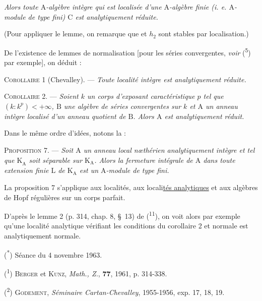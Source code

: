 
\textit{Alors toute $\mathrm A$-algèbre intègre qui est localisée d’une $\mathrm A$-algèbre finie (i. e. $\mathrm A$-module de type fini) $\mathrm C$ est analytiquement réduite.}

(Pour appliquer le lemme, on remarque que  et $h_2$ sont stables par localisation.)

De l’existence de lemmes de normalisation [pour les séries convergentes, \textit{voir} (\textsuperscript{5}) par exemple], on déduit :

\textsc{Corollaire 1} (Chevalley). --- \textit{Toute localité intègre est analytiquement réduite.}

\textsc{Corollaire 2.} --- \textit{Soient $k$ un corps d’exposant caractéristique $p$ tel que $(k:k^p)<+\infty$, $\mathrm B$ une algèbre de séries convergentes sur $k$ et $\mathrm A$ un anneau intègre localisé d’un anneau quotient de $\mathrm B$. Alors $\mathrm A$ est analytiquement réduit.}

Dans le même ordre d’idées, notons la :

\textsc{Proposition 7.} --- \textit{Soit $\mathrm A$ un anneau local nœthérien analytiquement intègre et tel que $\mathrm K_{\widehat{\mathrm A}}$ soit séparable sur $\mathrm K_{\mathrm A}$. Alors la fermeture intégrale de $\mathrm A$ dans toute extension finie $\mathrm L$ de $\mathrm K_{\mathrm A}$ est un $\mathrm A$-module de type fini.}
\margin{\handwritten{$\left.\rule{0pt}{2em}\right]$ connu (Nagata)}}

La proposition 7 s’applique aux localités, aux locali\uline{tés analytiques} et aux algèbres de Hopf régulières sur un corps parfait.

D’après le lemme 2 (p. 314, chap. 8, \S~13) de (\textsuperscript{11}), on voit alors par exemple qu’une localité analytique vérifiant les conditions du corollaire 2 et normale est analytiquement normale.

(\textsuperscript{*}) Séance du 4 novembre 1963.

(\textsuperscript{1}) \textsc{Berger} et \textsc{Kunz}, \textit{Math., Z.}, \textbf{77}, 1961, p. 314-338.

(\textsuperscript{2}) \textsc{Godement}, \textit{Séminaire Cartan-Chevalley}, 1955-1956, exp. 17, 18, 19.

